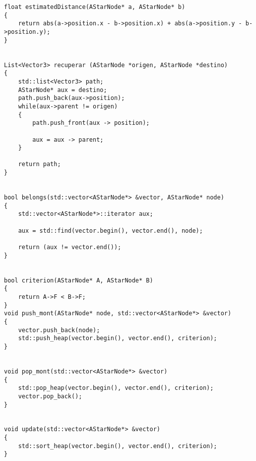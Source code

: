 \begin{verbatim}
float estimatedDistance(AStarNode* a, AStarNode* b)
{
    return abs(a->position.x - b->position.x) + abs(a->position.y - b->position.y);
}


List<Vector3> recuperar (AStarNode *origen, AStarNode *destino)
{
    std::list<Vector3> path;
    AStarNode* aux = destino;
    path.push_back(aux->position);
    while(aux->parent != origen)
    {
        path.push_front(aux -> position);

        aux = aux -> parent;
    }

    return path;
}


bool belongs(std::vector<AStarNode*> &vector, AStarNode* node)
{
    std::vector<AStarNode*>::iterator aux;

    aux = std::find(vector.begin(), vector.end(), node);

    return (aux != vector.end());
}


bool criterion(AStarNode* A, AStarNode* B)
{
    return A->F < B->F;
}
void push_mont(AStarNode* node, std::vector<AStarNode*> &vector)
{
    vector.push_back(node);
    std::push_heap(vector.begin(), vector.end(), criterion);
}


void pop_mont(std::vector<AStarNode*> &vector)
{
    std::pop_heap(vector.begin(), vector.end(), criterion);
    vector.pop_back();
}


void update(std::vector<AStarNode*> &vector)
{
    std::sort_heap(vector.begin(), vector.end(), criterion);
}



\end{verbatim}
